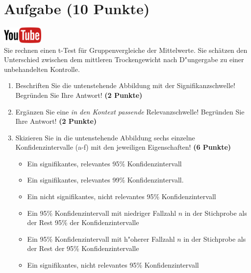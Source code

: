 \documentclass[a4paper, 9pt]{scrartcl}\usepackage[]{graphicx}\usepackage[]{xcolor}
\begin{document}
 
\clearpage

\section{Aufgabe \hfill (10 Punkte)}

\hfill\href{https://youtu.be/CN_O4fYPbhs}{\includegraphics[width =
  2cm]{img/youtube}}\\[1Ex]



Sie rechnen einen t-Test f{\"u}r Gruppenvergleiche der Mittelwerte. Sie
sch{\"a}tzen den Unterschied zwischen dem mittleren Trockengewicht nach D{"u}ngergabe zu einer unbehandelten
Kontrolle.

\begin{enumerate}
\item Beschriften Sie die untenstehende Abbildung mit der
  Signifikanzschwelle! Begr{\"u}nden Sie Ihre Antwort! \textbf{(2 Punkte)}
\item Erg{\"a}nzen Sie eine \textit{in den Kontext passende} Relevanzschwelle!
  Begr{\"u}nden Sie Ihre Antwort! \textbf{(2 Punkte)} 
\item Skizieren Sie in die
  untenstehende Abbildung sechs einzelne Konfidenzintervalle (a-f) mit den
  jeweiligen Eigenschaften! \textbf{(6 Punkte)}
  \begin{itemize}
  \item[(a)] Ein signifikantes, relevantes 95\% Konfidenzintervall 	
  \item[(b)] Ein signifikantes, relevantes 99\% Konfidenzintervall. 	
  \item[(c)] Ein nicht signifikantes, nicht relevantes 95\% Konfidenzintervall 	
  \item[(d)] Ein 95\% Konfidenzintervall mit niedriger Fallzahl $n$ in der Stichprobe als der Rest 95\% der Konfidenzintervalle 
  \item[(e)] Ein 95\% Konfidenzintervall mit h{"o}herer Fallzahl $n$ in der Stichprobe als der Rest der 95\% Konfidenzintervalle
  \item[(f)] Ein signifikantes, nicht relevantes 95\% Konfidenzintervall
  \end{itemize}
\end{enumerate}
\end{document}
